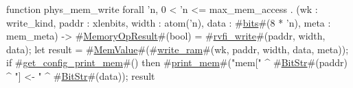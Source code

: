 function phys_mem_write forall 'n, 0 < 'n <= max_mem_access . (wk : write_kind, paddr : xlenbits, width : atom('n), data : #\hyperref[sailRISCVzbits]{bits}#(8 * 'n), meta : mem_meta) -> #\hyperref[sailRISCVzMemoryOpResult]{MemoryOpResult}#(bool) = {
  #\hyperref[sailRISCVzrvfizywrite]{rvfi\_write}#(paddr, width, data);
  let result = #\hyperref[sailRISCVzMemValue]{MemValue}#(#\hyperref[sailRISCVzwritezyram]{write\_ram}#(wk, paddr, width, data, meta));
  if   #\hyperref[sailRISCVzgetzyconfigzyprintzymem]{get\_config\_print\_mem}#()
  then #\hyperref[sailRISCVzprintzymem]{print\_mem}#("mem[" ^ #\hyperref[sailRISCVzBitStr]{BitStr}#(paddr) ^ "] <- " ^ #\hyperref[sailRISCVzBitStr]{BitStr}#(data));
  result
}
